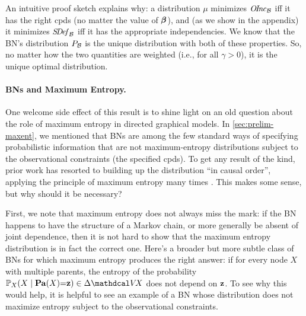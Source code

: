 An intuitive proof sketch explains why: a distribution $\mu$ minimizes $\OInc_{\cal B}$ iff it has the right cpds (no matter the value of $\bbeta$), and (as we show in the appendix) it minimizes $\SDef_{\cal B}$ iff it has the appropriate independencies. 
We know that the BN's distribution $\Pr_{\cal B}$ is the unique distribution with both of these properties. So, no matter how the two quantities are weighted (i.e., for all $\gamma > 0$), it is the unique optimal distribution.


\paragraph{BNs and Maximum Entropy.}
	\label{sec:bn-maxent}
One welcome side effect of this result is to shine light on an old question about the role of maximum entropy in directed graphical models.
In \cref{sec:prelim-maxent}, we mentioned that BNs 
are among the few standard ways of specifying probabilistic information that are not maximum-entropy distributions subject to the observational constraints (the specified cpds). 
To get any result of the kind, prior work has resorted to building up the distribution ``in causal order'', applying the principle of maximum entropy many times \citep{williamson2001foundations}.
This makes some sense, but why should it be necessary?

First, we note that maximum entropy does not always miss the mark:
if the BN happens to have the structure of a Markov chain, or more generally be absent of joint dependence, then it is not hard to show that the maximum entropy distribution is in fact the correct one. 
Here's a broader but more subtle class of BNs for which maximum entropy produces the right answer: 
if for every node $X$ with multiple parents, the entropy of the probability $\mathbb P_X(X \mid \Pa(X){=}\mat z) \in \Delta \V \! X$ does not depend on $\mat z$. 
To see why this would help, it is helpful to see
    an example of a BN whose distribution does not maximize entropy
        subject to the observational constraints. 

